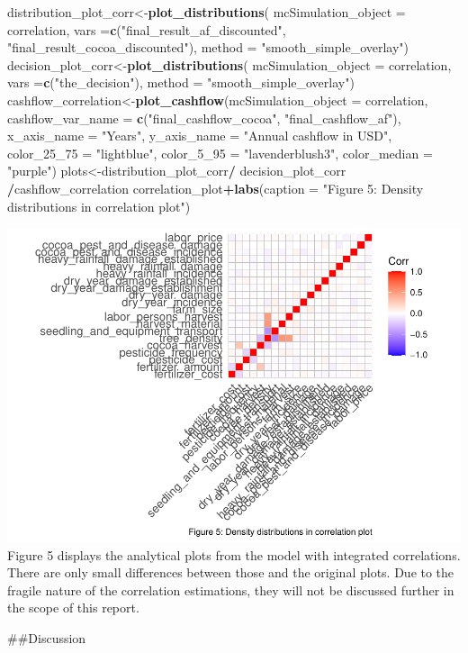 \documentclass[
]{article}
\newenvironment{Shaded}{\begin{snugshade}}{\end{snugshade}}
\newcommand{\AttributeTok}[1]{\textcolor[rgb]{0.13,0.29,0.53}{#1}}
\newcommand{\FunctionTok}[1]{\textcolor[rgb]{0.13,0.29,0.53}{\textbf{#1}}}
\newcommand{\NormalTok}[1]{#1}
\newcommand{\OtherTok}[1]{\textcolor[rgb]{0.56,0.35,0.01}{#1}}
\newcommand{\SpecialCharTok}[1]{\textcolor[rgb]{0.81,0.36,0.00}{\textbf{#1}}}
\newcommand{\StringTok}[1]{\textcolor[rgb]{0.31,0.60,0.02}{#1}}
\begin{document}
\begin{Shaded}
\begin{Highlighting}[]
\NormalTok{distribution\_plot\_corr}\OtherTok{\textless{}{-}}\FunctionTok{plot\_distributions}\NormalTok{(}
  \AttributeTok{mcSimulation\_object =}\NormalTok{ correlation,}
  \AttributeTok{vars =}\FunctionTok{c}\NormalTok{(}\StringTok{"final\_result\_af\_discounted"}\NormalTok{, }\StringTok{"final\_result\_cocoa\_discounted"}\NormalTok{),}
  \AttributeTok{method =} \StringTok{"smooth\_simple\_overlay"}\NormalTok{)}
\NormalTok{decision\_plot\_corr}\OtherTok{\textless{}{-}}\FunctionTok{plot\_distributions}\NormalTok{(}
  \AttributeTok{mcSimulation\_object =}\NormalTok{ correlation,}
  \AttributeTok{vars =}\FunctionTok{c}\NormalTok{(}\StringTok{"the\_decision"}\NormalTok{),}
  \AttributeTok{method =} \StringTok{"smooth\_simple\_overlay"}\NormalTok{)}
\NormalTok{cashflow\_correlation}\OtherTok{\textless{}{-}}\FunctionTok{plot\_cashflow}\NormalTok{(}\AttributeTok{mcSimulation\_object =}\NormalTok{ correlation, }\AttributeTok{cashflow\_var\_name =} \FunctionTok{c}\NormalTok{(}\StringTok{"final\_cashflow\_cocoa"}\NormalTok{, }\StringTok{"final\_cashflow\_af"}\NormalTok{),  }\AttributeTok{x\_axis\_name =} \StringTok{"Years"}\NormalTok{,}
              \AttributeTok{y\_axis\_name =} \StringTok{"Annual cashflow in USD"}\NormalTok{,}
              \AttributeTok{color\_25\_75 =} \StringTok{"lightblue"}\NormalTok{, }\AttributeTok{color\_5\_95 =} \StringTok{"lavenderblush3"}\NormalTok{,}
              \AttributeTok{color\_median =} \StringTok{"purple"}\NormalTok{)}
\NormalTok{plots}\OtherTok{\textless{}{-}}\NormalTok{distribution\_plot\_corr}\SpecialCharTok{/}\NormalTok{ decision\_plot\_corr }\SpecialCharTok{/}\NormalTok{cashflow\_correlation}
\NormalTok{correlation\_plot}\SpecialCharTok{+}\FunctionTok{labs}\NormalTok{(}\AttributeTok{caption =} \StringTok{"Figure 5: Density distributions in correlation plot"}\NormalTok{)}
\end{Highlighting}
\end{Shaded}

\includegraphics{Report_files/figure-latex/unnamed-chunk-2-1.pdf} Figure
5 displays the analytical plots from the model with integrated
correlations. There are only small differences between those and the
original plots. Due to the fragile nature of the correlation
estimations, they will not be discussed further in the scope of this
report.

\#\#Discussion
\end{document}
